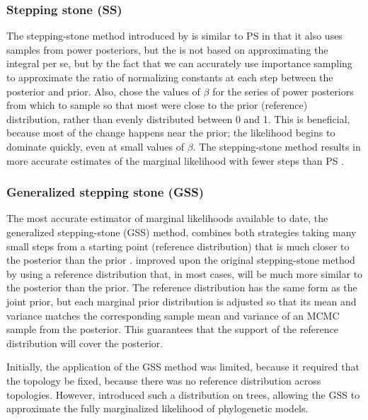 \subsubsection{Stepping stone (SS)}
The stepping-stone method introduced by \citet{Xie2011}
is similar to PS in that it also uses samples from power posteriors, but the
 is not based on approximating the integral per se, but by
the fact that we can accurately use importance sampling to approximate the
ratio of normalizing constants  at each step between the posterior and prior.
Also, \citet{Xie2011} chose the values of $\beta$ for the
series of power posteriors from which to sample so that most were close to
the prior (reference) distribution, rather than evenly distributed between
0 and 1.
This is beneficial, because most of the change happens near the prior; the
likelihood begins to dominate quickly, even at small values of $\beta$.
The stepping-stone method results in more accurate estimates of the marginal
likelihood with fewer steps than PS \citep{Xie2011}.

\subsubsection{Generalized stepping stone (GSS)}
The most accurate estimator of marginal likelihoods available to date, the
generalized stepping-stone (GSS) method, combines both strategies
taking many small steps from a starting point (reference distribution) that
is much closer to the posterior than the prior \citep{Fan2011}.
\citet{Fan2011} improved upon the original stepping-stone
method by using a reference distribution that, in most cases, will be much more
similar to the posterior than the prior.
The reference distribution has the same form as the joint prior, but each
marginal prior distribution is adjusted so that its mean and variance matches
the corresponding sample mean and variance of an MCMC sample from the
posterior.
This guarantees that the support of the reference distribution will cover the
posterior.

Initially, the application of the GSS method was limited, because it required
that the topology be fixed, because there was no reference distribution across
topologies.
However, \citet{Holder2014} introduced such a distribution
on trees, allowing the GSS to approximate the fully marginalized likelihood of
phylogenetic models.

